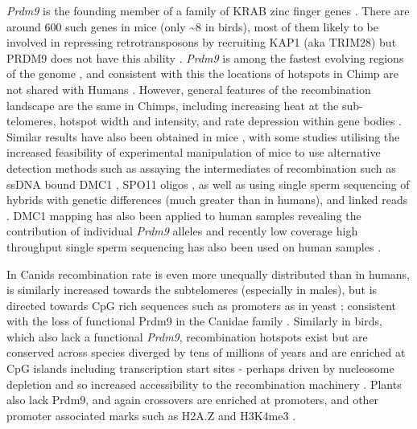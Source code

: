 \textit{Prdm9} is the founding member of a family of KRAB zinc finger genes \parencite{Birtle2006Meisetz}.
There are around 600 such genes in mice (only \textasciitilde8 in birds), most of them likely to be involved in repressing retrotransposons by recruiting KAP1 (aka TRIM28) but PRDM9 does not have this ability \parencite{Imbeault2017KRAB, Bruno2019Arms}.
\textit{Prdm9} is among the fastest evolving regions of the genome \parencite{Oliver2009Accelerated}, and consistent with this the locations of hotspots in Chimp are not shared with Humans \parencite{Wall2003Comparative, Ptak2004Absence, Ptak2005Finescale, Winckler2005Comparison}.
However, general features of the recombination landscape are the same in Chimps, including increasing heat at the sub-telomeres, hotspot width and intensity, and rate depression within gene bodies \parencite{Auton2012FineScale}.
Similar results have also been obtained in mice \parencite{Paigen2008Recombinational, Brunschwig2012FineScale, Booker2017Recombination}, with some studies utilising the increased feasibility of experimental manipulation of mice to use alternative detection methods such as assaying the intermediates of recombination such as ssDNA bound DMC1 \parencite{Smagulova2011Genomewide, Khil2012Sensitive, Smagulova2016evolutionary}, SPO11 oligos \parencite{Lange2016Landscape}, as well as using single sperm sequencing of hybrids with genetic differences (much greater than in humans)\parencite{Hinch2019Factors}, and linked reads \parencite{Dreau2019Genomewide}.
DMC1 mapping has also been applied to human samples revealing the contribution of individual \textit{Prdm9} alleles \parencite{Pratto2014Recombination} and recently low coverage high throughput single sperm sequencing has also been used on human samples \parencite{Bell2019Insights}.

In Canids recombination rate is even more unequally distributed than in humans, is similarly increased towards the subtelomeres (especially in males), but is directed towards CpG rich sequences such as promoters as in yeast \parencite{Auton2013Genetic, Campbell2016PedigreeBased}; consistent with the loss of functional Prdm9 in the Canidae family \parencite{Munoz-Fuentes2011Prdm9}.
Similarly in birds, which also lack a functional \textit{Prdm9}, recombination hotspots exist but are conserved across species diverged by tens of millions of years and are enriched at CpG islands including transcription start sites - perhaps driven by nucleosome depletion and so increased accessibility to the recombination machinery \parencite{Singhal2015Stable}.
Plants also lack Prdm9, and again crossovers are enriched at promoters, and other promoter associated marks such as H2A.Z and H3K4me3 \parencite{Choi2013Arabidopsis, Marand2017Meiotic}.

